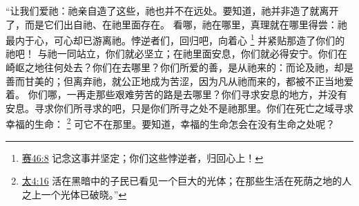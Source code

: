 \documentclass[12pt, a4paper, oneside]{ctexart}
\begin{document}
    “让我们爱祂：祂亲自造了这些，祂也并不在远处。要知道，祂并非造了就离开了，而是它们出自祂、在祂里面存在。
    看哪，祂在哪里，真理就在哪里得尝：祂最内于心，可心却已游离祂。悖逆者们，回归吧，向着心
    \footnote {
        \href{https://biblehub.com/isaiah/46-8.htm}{赛46:8} 记念这事并坚定；你们这些悖逆者，归回心上！
    }
    并紧贴那造了你们的祂吧！
    与祂一同站立，你们就必坚立；在祂里面安息，你们就必得安宁。你们在崎岖之地往何处去？你们在去哪里？你们所爱的善，是从祂来的：而论及祂，却是善而甘美的；但离弃祂，就公正地成为苦涩，因为凡从祂而来的，都被不正当地爱着。
    你们哪，一再走那些艰难劳苦的路是去哪里？你们寻求安息的地方，并没有安息。寻求你们所寻求的吧，只是你们所寻之处不是祂那里。你们在死亡之域寻求幸福的生命：
    \footnote {
        \href{https://biblehub.com/matthew/4-16.htm}{太4:16} 活在黑暗中的子民已看见一个巨大的光体；在那些生活在死荫之地的人之上一个光体已破晓。”
    }
    可它不在那里。要知道，幸福的生命怎会在没有生命之处呢？
\end{document}
